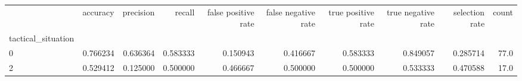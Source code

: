 \begin{tabular}{lrrrrrrrrr}
\toprule
{} &  accuracy &  precision &    recall &  false positive rate &  false negative rate &  true positive rate &  true negative rate &  selection rate &  count \\
tactical\_situation &           &            &           &                      &                      &                     &                     &                 &        \\
\midrule
0                  &  0.766234 &   0.636364 &  0.583333 &             0.150943 &             0.416667 &            0.583333 &            0.849057 &        0.285714 &   77.0 \\
2                  &  0.529412 &   0.125000 &  0.500000 &             0.466667 &             0.500000 &            0.500000 &            0.533333 &        0.470588 &   17.0 \\
\bottomrule
\end{tabular}
